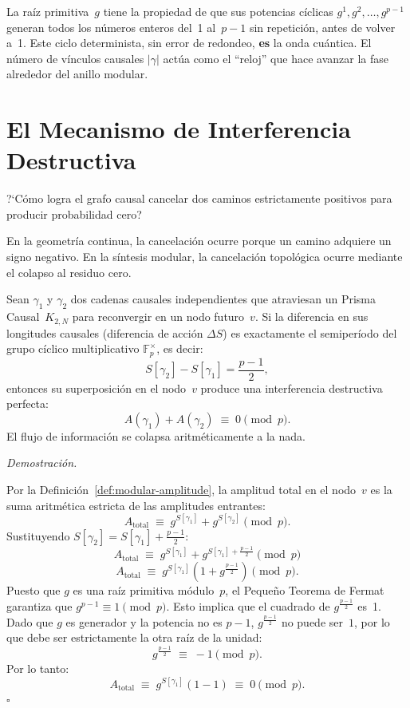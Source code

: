 \documentclass[11pt, a4paper, openany]{book}
\renewenvironment{proof}[1][Demostraci\'on]{%
  \par\noindent\textit{#1.}\quad
}{\hfill$\square$\par\medskip}
\begin{document}
\noindent
La ra\'iz primitiva~$g$ tiene la propiedad de que sus potencias
c\'iclicas $g^1, g^2, \ldots, g^{p-1}$ generan todos los n\'umeros
enteros del~1 al~$p-1$ sin repetici\'on, antes de volver a~1. Este
ciclo determinista, sin error de redondeo, \textbf{es} la onda
cu\'antica. El n\'umero de v\'inculos causales $|\gamma|$ act\'ua como
el ``reloj'' que hace avanzar la fase alrededor del anillo modular.

\section{El Mecanismo de Interferencia Destructiva}
\label{sec:destructive-interference}

?`C\'omo logra el grafo causal cancelar dos caminos estrictamente
positivos para producir probabilidad cero?

En la geometr\'ia continua, la cancelaci\'on ocurre porque un camino
adquiere un signo negativo. En la s\'intesis modular, la cancelaci\'on
topol\'ogica ocurre mediante el colapso al residuo cero.

\begin{theorem}
\label{thm:quantum-interference}
Sean $\gamma_1$ y $\gamma_2$ dos cadenas causales independientes que
atraviesan un Prisma Causal~$K_{2,N}$ para reconvergir en un nodo
futuro~$v$. Si la diferencia en sus longitudes causales (diferencia de
acci\'on $\Delta S$) es exactamente el semiper\'iodo del grupo c\'iclico
multiplicativo $\mathbb{F}_p^\times$, es decir:
\[
  S[\gamma_2] - S[\gamma_1] = \frac{p-1}{2},
\]
entonces su superposici\'on en el nodo~$v$ produce una interferencia
destructiva perfecta:
\begin{equation}
  A(\gamma_1) + A(\gamma_2) \;\equiv\; 0 \pmod p.
  \label{eq:destructive-interference}
\end{equation}
El flujo de informaci\'on se colapsa aritm\'eticamente a la nada.
\end{theorem}

\begin{proof}
Por la Definici\'on~\ref{def:modular-amplitude}, la amplitud total en el
nodo~$v$ es la suma aritm\'etica estricta de las amplitudes entrantes:
\[
  A_{\text{total}} \;\equiv\; g^{S[\gamma_1]} + g^{S[\gamma_2]} \pmod p.
\]
Sustituyendo $S[\gamma_2] = S[\gamma_1] + \frac{p-1}{2}$:
\[
  A_{\text{total}} \;\equiv\; g^{S[\gamma_1]} + g^{S[\gamma_1] + \frac{p-1}{2}} \pmod p
\]
\[
  A_{\text{total}} \;\equiv\; g^{S[\gamma_1]} \left( 1 + g^{\frac{p-1}{2}} \right) \pmod p.
\]
Puesto que $g$ es una ra\'iz primitiva m\'odulo~$p$, el Peque\~no
Teorema de Fermat garantiza que $g^{p-1} \equiv 1 \pmod p$. Esto
implica que el cuadrado de $g^{\frac{p-1}{2}}$ es~1. Dado que $g$ es
generador y la potencia no es $p-1$, $g^{\frac{p-1}{2}}$ no puede
ser~$1$, por lo que debe ser estrictamente la otra ra\'iz de la unidad:
\[
  g^{\frac{p-1}{2}} \;\equiv\; -1 \pmod p.
\]
Por lo tanto:
\[
  A_{\text{total}} \;\equiv\; g^{S[\gamma_1]} ( 1 - 1 ) \;\equiv\; 0 \pmod p.
\]
\end{proof}
\end{document}
